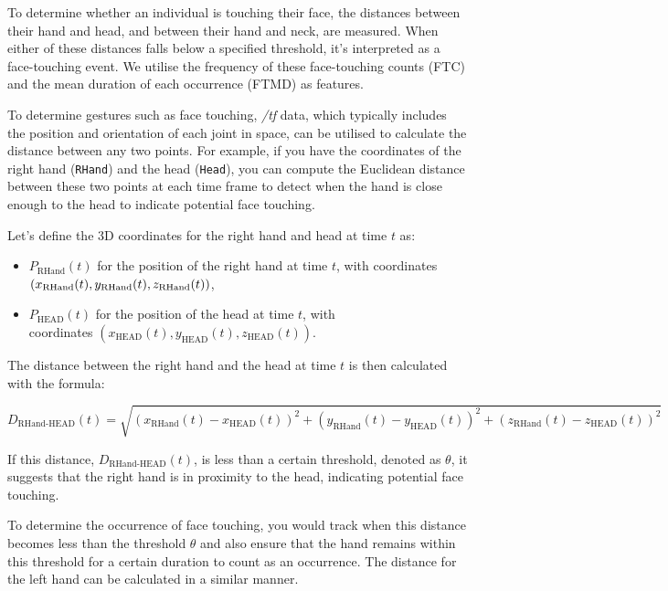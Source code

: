 To determine whether an individual is touching their face, the distances between their hand and head, and between their hand and neck, are measured. When either of these distances falls below a specified threshold, it's interpreted as a face-touching event. We utilise the frequency of these face-touching counts (FTC) and the mean duration of each occurrence (FTMD) as features.\parencite{aigram} 

To determine gestures such as face touching, \textit{/tf} data, which typically includes the position and orientation of each joint in space, can be utilised to calculate the distance between any two points. For example, if you have the coordinates of the right hand (\texttt{RHand}) and the head (\texttt{Head}), you can compute the Euclidean distance between these two points at each time frame to detect when the hand is close enough to the head to indicate potential face touching.

Let's define the 3D coordinates for the right hand and head at time $t$ as:
\begin{itemize}
\item $P_{\text{RHand}}(t)$ for the position of the right hand at time $t$, with coordinates $(x_{\text{RHand}}(t), \\ y_{\text{RHand}}(t), z_{\text{RHand}}(t))$,
\item $P_{\text{HEAD}}(t)$ for the position of the head at time $t$, with \\ coordinates $(x_{\text{HEAD}}(t), y_{\text{HEAD}}(t), z_{\text{HEAD}}(t))$.
\end{itemize}

The distance between the right hand and the head at time $t$ is then calculated with the formula:

\begin{equation}
D_{\text{RHand-HEAD}}(t) = \sqrt{(x_{\text{RHand}}(t) - x_{\text{HEAD}}(t))^2 + (y_{\text{RHand}}(t) - y_{\text{HEAD}}(t))^2 + (z_{\text{RHand}}(t) - z_{\text{HEAD}}(t))^2}
\end{equation}

If this distance, $D_{\text{RHand-HEAD}}(t)$, is less than a certain threshold, denoted as $\theta$, it suggests that the right hand is in proximity to the head, indicating potential face touching.

To determine the occurrence of face touching, you would track when this distance becomes less than the threshold $\theta$ and also ensure that the hand remains within this threshold for a certain duration to count as an occurrence. The distance for the left hand can be calculated in a similar manner.


